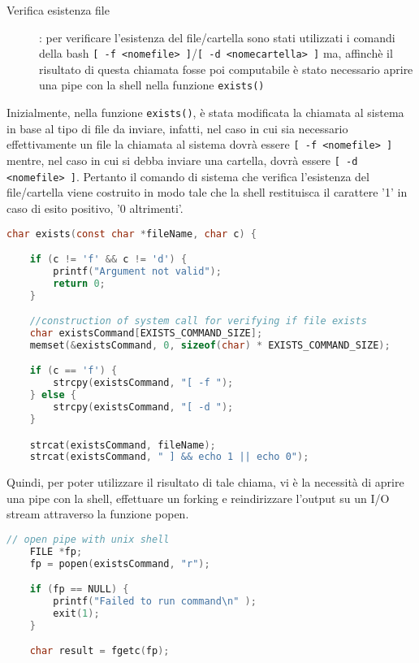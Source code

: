 \documentclass[11pt,fleqn]{book} %
\begin{document}
\begin{description}
		
	\item[Verifica esistenza file]: per verificare l'esistenza del file/cartella sono stati utilizzati i comandi della bash \texttt{[ -f <nomefile> 			]}/\texttt{[ -d <nomecartella> ]} ma, affinchè il risultato di questa chiamata fosse poi computabile è stato necessario aprire una pipe con la 			shell nella funzione \texttt{exists()}		
\end{description}
\medskip
Inizialmente, nella funzione \texttt{exists()}, è stata modificata la chiamata al sistema in base al tipo di file da inviare, infatti, nel caso in cui sia necessario effettivamente un file la chiamata al sistema dovrà essere \texttt{[ -f <nomefile> ]} mentre, nel caso in cui si debba inviare una cartella, dovrà essere \texttt{[ -d <nomefile> ]}.
Pertanto il comando di sistema che verifica l'esistenza del file/cartella viene costruito in modo tale che la shell restituisca il carattere '1' in caso di esito positivo, '0 altrimenti'.
\begin{lstlisting}[language=C]
char exists(const char *fileName, char c) {

	if (c != 'f' && c != 'd') {
		printf("Argument not valid");
		return 0;
	}

	//construction of system call for verifying if file exists
	char existsCommand[EXISTS_COMMAND_SIZE];
	memset(&existsCommand, 0, sizeof(char) * EXISTS_COMMAND_SIZE);

	if (c == 'f') {
		strcpy(existsCommand, "[ -f ");
	} else {
		strcpy(existsCommand, "[ -d ");
	}

	strcat(existsCommand, fileName);
	strcat(existsCommand, " ] && echo 1 || echo 0");
\end{lstlisting}

Quindi, per poter utilizzare il risultato di tale chiama, vi è la necessità di aprire una pipe con la shell, effettuare un forking e reindirizzare l'output su un I/O stream attraverso la funzione popen.

\begin{lstlisting}[language=C]
	// open pipe with unix shell
	FILE *fp;
	fp = popen(existsCommand, "r");

	if (fp == NULL) {
    	printf("Failed to run command\n" );
    	exit(1);
  	}

  	char result = fgetc(fp);
\end{lstlisting}

\end{document}
